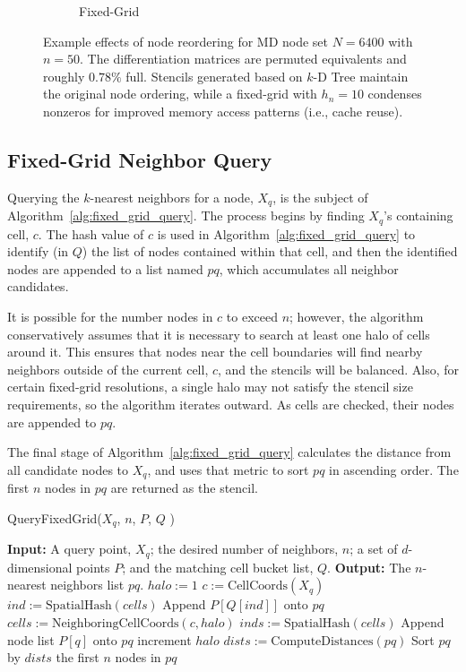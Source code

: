 \documentclass{report}
\begin{document}
\begin{figure}
\begin{subfigure}{0.425\textwidth}
\caption{Fixed-Grid}
\end{subfigure}
\caption{Example effects of node reordering for MD node set $N=6400$ with $n=50$. The differentiation matrices are permuted equivalents and roughly $0.78\%$ full. Stencils generated based on $k$-D Tree maintain the original node ordering, while a fixed-grid with $h_n=10$ condenses nonzeros for improved memory access patterns (i.e., cache reuse).}
\label{fig:reorder_example}
\end{figure} 

\subsection{Fixed-Grid Neighbor Query}

Querying the $k$-nearest neighbors for a node, $X_q$, is the subject of Algorithm~\ref{alg:fixed_grid_query}. The process begins by finding $X_q$'s containing cell, $c$. The hash value of $c$ is used in Algorithm~\ref{alg:fixed_grid_query} to identify (in $Q$) the list of nodes contained within that cell, and then the identified nodes are appended to a list named $pq$, which accumulates all neighbor candidates. 

It is possible for the number nodes in $c$ to exceed $n$; however, the algorithm conservatively assumes that it is necessary to search at least one halo of cells around it.  This ensures that nodes near the cell boundaries will find nearby neighbors outside of the current cell, $c$, and the stencils will be balanced. Also, for certain fixed-grid resolutions, a single halo may not satisfy the stencil size requirements, so the algorithm iterates outward. As cells are checked, their nodes are appended to $pq$. 

The final stage of Algorithm~\ref{alg:fixed_grid_query} calculates the distance from all candidate nodes to $X_q$, and uses that metric to sort $pq$ in ascending order. The first $n$ nodes in $pq$ are returned as the stencil. 
\begin{algorithm} 
\caption{QueryFixedGrid($X_q$, $n$, $P$, $Q$ )}         
\label{alg:fixed_grid_query}  
\begin{algorithmic}[1]    
    \State \textbf{Input:} A query point, $X_q$; the desired number of neighbors, $n$; a set of $d$-dimensional points $P$; and the matching cell bucket list, $Q$.
    \State \textbf{Output:} The $n$-nearest neighbors list $pq$.
    \State     
    \State $halo := 1$
    \State $c := \text{CellCoords}(X_q)$ 
    \State $ind := \text{SpatialHash}(cells)$
    \State Append $P[Q[ind]]$ onto $pq$
        \State $cells := \text{NeighboringCellCoords}(c, halo)$
        \State $inds := \text{SpatialHash}(cells)$
            \State Append node list $P[q]$ onto $pq$
            \EndIf
        \EndFor
        \State increment $halo$
    \EndWhile
    \State $dists := \text{ComputeDistances}(pq)$
    \State Sort $pq$ by $dists$
    \State \Return the first $n$ nodes in $pq$
    \end{algorithmic}
\end{algorithm}
\end{document}

